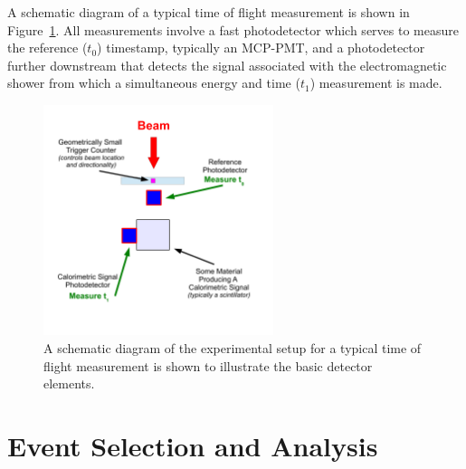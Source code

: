 \documentclass[12pt]{article}
\begin{document}
A schematic diagram of a typical time of flight measurement
is shown in Figure~\ref{fig:TypicalSchematicDiagram}. All
measurements involve a fast photodetector which serves to
measure the reference ($t_{0}$) timestamp, typically 
an MCP-PMT, and a photodetector further downstream
that detects the signal associated with the
electromagnetic shower from which a simultaneous energy 
and time ($t_{1}$) measurement is made. 

\begin{figure}[h] \centering
\includegraphics[width=0.6\textwidth]{figs/TypicalSchematicDiagram} 
\caption{A schematic diagram of the experimental setup for
a typical time of flight measurement is shown to illustrate the
basic detector elements.} 
\label{fig:TypicalSchematicDiagram}
\end{figure}

\section{Event Selection and Analysis}
\end{document}
